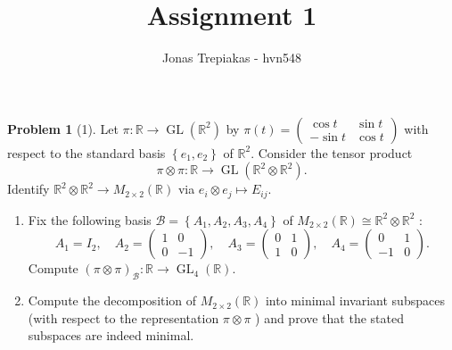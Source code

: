\documentclass[reqno]{amsart}
\title{Assignment 1}
\author{Jonas Trepiakas - hvn548}
\date{}
\theoremstyle{definition}
\newtheorem{problem}[theorem]{Problem}
\theoremstyle{remark}
\DeclareMathOperator{\GL}{GL}
\begin{document}
\maketitle
    \begin{problem}[1]
        Let $\pi \colon \mathbb{R} \to 
        \GL \left( \mathbb{R}^2 \right) $ by
        $\pi(t) = 
        \begin{pmatrix} \cos t & \sin t\\
        - \sin t & \cos t \end{pmatrix} $ with respect to the
        standard basis $\left\{ e_1,e_2 \right\} $ of
        $\mathbb{R}^2$. Consider the tensor product
        \[
        \pi \otimes \pi \colon
        \mathbb{R} \to \GL \left( \mathbb{R}^2 
        \otimes \mathbb{R}^2\right) .
        \] 
        Identify $\mathbb{R}^2 \otimes \mathbb{R}^2\to 
        M_{2\times 2}(\mathbb{R})$ via
        $e_i \otimes e_j \mapsto E_{ij}$.
        \begin{enumerate}
            \item Fix the following basis
                $\mathcal{B} = \left\{ A_1,A_2,A_3,A_4 \right\} $ 
                of $M_{2\times 2}\left( \mathbb{R} \right) 
                \cong \mathbb{R}^2 \otimes \mathbb{R}^2$ :
                \[
                A_1 =I_2, \quad
                A_2 =
                \begin{pmatrix} 1 & 0 \\ 0
                & -1 \end{pmatrix} , \quad
                    A_3 = \begin{pmatrix} 0 & 1\\
                    1 & 0\end{pmatrix} , \quad
                        A_4 = \begin{pmatrix} 0 & 1\\
                        -1 & 0 \end{pmatrix} .
                \] 
                Compute 
                $\left( \pi \otimes \pi \right)_{\mathcal{B}}
                \colon \mathbb{R} \to \GL_{4}\left( \mathbb{R}
                \right) $.
            \item Compute the decomposition of $M_{2\times 2}
                (\mathbb{R})$ into minimal invariant subspaces
                (with respect to the representation
                $\pi \otimes \pi$ ) and prove that
                the stated subspaces are indeed minimal.
        \end{enumerate}
    \end{problem}
\end{document}
